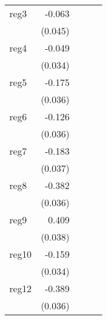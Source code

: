 {\begin{longtable}{l*{4}{D{.}{.}{-1}}}
\addlinespace
reg3        &      -0.063         &                     &                     &                     \\
            &     (0.045)         &                     &                     &                     \\
\addlinespace
reg4        &      -0.049         &                     &                     &                     \\
            &     (0.034)         &                     &                     &                     \\
\addlinespace
reg5        &      -0.175\sym{***}&                     &                     &                     \\
            &     (0.036)         &                     &                     &                     \\
\addlinespace
reg6        &      -0.126\sym{***}&                     &                     &                     \\
            &     (0.036)         &                     &                     &                     \\
\addlinespace
reg7        &      -0.183\sym{***}&                     &                     &                     \\
            &     (0.037)         &                     &                     &                     \\
\addlinespace
reg8        &      -0.382\sym{***}&                     &                     &                     \\
            &     (0.036)         &                     &                     &                     \\
\addlinespace
reg9        &       0.409\sym{***}&                     &                     &                     \\
            &     (0.038)         &                     &                     &                     \\
\addlinespace
reg10       &      -0.159\sym{***}&                     &                     &                     \\
            &     (0.034)         &                     &                     &                     \\
\addlinespace
reg12       &      -0.389\sym{***}&                     &                     &                     \\
            &     (0.036)         &                     &                     &                     \\

\end{longtable}}
